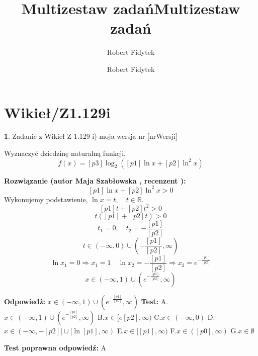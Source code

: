 \documentclass[12pt, a4paper]{article}
\title{Multizestaw zadań}
\author{Robert Fidytek}
\date{}\documentclass[12pt, a4paper]{article}
\title{Multizestaw zadań}
\author{Robert Fidytek}
\date{}
\theoremstyle{definition} %
\newtheorem{zad}{}
\theoremstyle{definition} %
\newtheorem{zad}{}
\newcommand{\kategoria}[1]{\section{#1}} %
\newcommand{\zadStart}[1]{\begin{zad}#1\newline} %
\newcommand{\zadStop}{\end{zad}}   %
\newcommand{\rozwStart}[2]{\noindent \textbf{Rozwiązanie (autor #1 , recenzent #2): }\newline} %
\newcommand{\rozwStop}{\newline}                                            %
\newcommand{\odpStart}{\noindent \textbf{Odpowiedź:}\newline}    %
\newcommand{\odpStop}{\newline}                                             %
\newcommand{\testStart}{\noindent \textbf{Test:}\newline} %
\newcommand{\testStop}{\newline} %
\newcommand{\kluczStart}{\noindent \textbf{Test poprawna odpowiedź:}\newline} %
\newcommand{\kluczStop}{\newline} %
\begin{document}
\maketitle


\kategoria{Wikieł/Z1.129i}
\zadStart{Zadanie z Wikieł Z 1.129 i) moja wersja nr [nrWersji]}

Wyznaczyć dziedzinę naturalną funkcji.
$$f(x)=[p3]\log_{2}([p1]\ln x + [p2]\ln^{2}x)$$

\zadStop

\rozwStart{Maja Szabłowska}{}
$$[p1]\ln x + [p2]\ln^{2}x>0$$
Wykonujemy podstawienie, $\ln x=t, \quad t\in\mathbb{R}.$
$$[p1]t+[p2]t^{2}>0 $$
$$t([p1]+[p2]t)>0$$
$$t_{1}=0, \quad t_{2}=-\frac{[p1]}{[p2]}$$
$$t\in (-\infty,0)\cup\left(-\frac{[p1]}{[p2]},\infty\right)$$
$$\ln x_{1}=0 \Rightarrow x_{1}=1 \quad \ln x_{2}=-\frac{[p1]}{[p2]} \Rightarrow x_{2}=e^{-\frac{[p1]}{[p2]}}$$
$$x\in (-\infty,1)\cup\left(e^{-\frac{[p1]}{[p2]}},\infty\right)$$

\rozwStop
\odpStart
$x\in (-\infty,1)\cup\left(e^{-\frac{[p1]}{[p2]}},\infty\right)$
\odpStop
\testStart
A.$x\in (-\infty,1)\cup\left(e^{-\frac{[p1]}{[p2]}},\infty\right)$
B.$x\in[e[p2],\infty)$
C.$x\in(-\infty, 0)$
D.$x\in(-\infty, -[p2]] \cup [\ln[p1],\infty)$
E.$x\in[[p1],\infty)$
F.$x\in([p0],\infty)$
G.$x\in\emptyset$

\testStop
\kluczStart
A
\kluczStop
\end{document}
